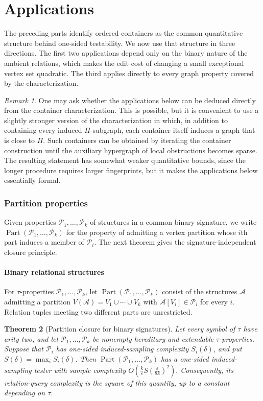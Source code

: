 \documentclass[11pt,reqno,letterpaper]{amsart}
\newcommand{\Part}{\operatorname{Part}}
\newcommand{\cA}{{\mathcal A}}
\newcommand{\cP}{{\mathcal P}}
\theoremstyle{plain}
\newtheorem{thm}{Theorem}[section]
\theoremstyle{remark}
\newtheorem{rem}[thm]{Remark}
\begin{document}
\part{Applications}

The preceding parts identify ordered containers as the common quantitative structure behind one-sided testability.  We now use that structure in three directions.  The first two applications depend only on the binary nature of the ambient relations, which makes the edit cost of changing a small exceptional vertex set quadratic.  The third applies directly to every graph property covered by the characterization.
\begin{rem}
One may ask whether the applications below can be deduced directly from the container characterization. This is possible, but it is convenient to use a slightly stronger version of the characterization in which, in addition to containing every induced $\Pi$-subgraph, each container itself induces a graph that is close to $\Pi$. Such containers can be obtained by iterating the container construction until the auxiliary hypergraph of local obstructions becomes sparse. The resulting statement has somewhat weaker quantitative bounds, since the longer procedure requires larger fingerprints, but it makes the applications below essentially formal.
\end{rem}
\section{Partition properties}
\label{sec:partition-applications}

Given properties $\cP_1,\dots,\cP_k$ of structures in a common binary signature, we write $\Part(\cP_1,\dots,\cP_k)$ for the property of admitting a vertex partition whose $i$th part induces a member of $\cP_i$.  The next theorem gives the signature-independent closure principle.

\subsection{Binary relational structures}

For $\tau$-properties $\cP_1,\dots,\cP_k$, let
$\Part(\cP_1,\dots,\cP_k)$ consist of the structures $\cA$ admitting a
partition $V(\cA)=V_1\cup\cdots\cup V_k$ with
$\cA[V_i]\in\cP_i$ for every $i$.  Relation tuples meeting two different
parts are unrestricted.

\begin{thm}[Partition closure for binary signatures]
\label{thm:relational-partition-closure}
Let every symbol of $\tau$ have arity two, and let
$\cP_1,\dots,\cP_k$ be nonempty hereditary and extendable
$\tau$-properties.  Suppose that $\cP_i$ has one-sided induced-sampling
complexity $S_i(\delta)$, and put
$S(\delta)=\max_iS_i(\delta)$.  Then
$\Part(\cP_1,\dots,\cP_k)$ has a one-sided induced-sampling tester with sample
complexity
\(\widetilde O\!\left( \frac{k}{\varepsilon} S\!\left(\frac{\varepsilon}{8k}\right)^2 \right).\)
Consequently, its relation-query complexity is the square of this quantity,
up to a constant depending on $\tau$.
\end{thm}
\end{document}
